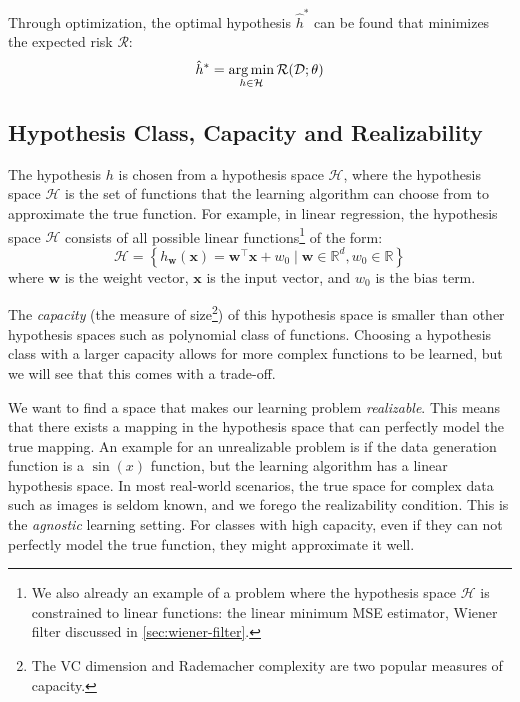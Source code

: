 Through optimization, the optimal hypothesis $\hat{h}^*$ can be found that minimizes the expected risk $\mathcal{R}$:
\begin{equation}\label{eq:risk-min}
    \hat{h}^* = \operatorname*{arg\,min}_{h \in \mathcal{H}} \mathcal{R}(\mathcal{D}; \theta)
\end{equation}

\subsection{Hypothesis Class, Capacity and Realizability}
The hypothesis $h$ is chosen from a hypothesis space $\mathcal{H}$, where the hypothesis space $\mathcal{H}$ is the set of functions that the learning algorithm can choose from to approximate the true function. 
For example, in linear regression, the hypothesis space $\mathcal{H}$ consists of all possible linear functions\footnote{We also already an example of a problem where the hypothesis space $\mathcal{H}$ is constrained to linear functions: the linear minimum \gls{MSE} estimator, Wiener filter discussed in \cref{sec:wiener-filter}.} of the form:
\begin{equation}\label{eq:linear-hypothesis}
   \mathcal{H} =  \left\{ h_{\mathbf{w}}(\mathbf{x}) = \mathbf{w}^\top \mathbf{x} + w_0 \mid \mathbf{w} \in \mathbb{R}^d, w_0 \in \mathbb{R} \right\}
\end{equation}
where $\mathbf{w}$ is the weight vector, $\mathbf{x}$ is the input vector, and $w_0$ is the bias term. 

The \textit{capacity} (the measure of size\footnote{The VC dimension and Rademacher complexity are two popular measures of capacity.}) of this hypothesis space is smaller than other hypothesis spaces such as polynomial class of functions. Choosing a hypothesis class with a larger capacity allows for more complex functions to be learned, but we will see that this comes with a trade-off.

We want to find a space that makes our learning problem \textit{realizable}. This means that there exists a mapping in the hypothesis space that can perfectly model the true mapping. An example for an unrealizable problem is if the data generation function is a $\sin(x)$ function, but the learning algorithm has a linear hypothesis space. In most real-world scenarios, the true space for complex data such as images is seldom known, and we forego the realizability condition. This is the \textit{agnostic} learning setting. For classes with high capacity, even if they can not perfectly model the true function, they might approximate it well.

